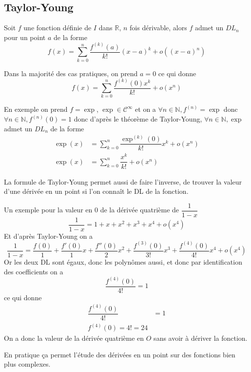 \documentclass[11pt,colorlinks]{book}
\theoremstyle{mytheoremstyle}
\theoremstyle{mytheoremstyle}
\theoremstyle{mytheoremstyle}
\theoremstyle{mytheoremstyle}
\theoremstyle{mytheoremstyle}
\theoremstyle{mytheoremstyle}
\theoremstyle{mytheoremstyle}
\theoremstyle{mytheoremstyle}
\theoremstyle{myproblemstyle}
\def\mbb#1{\mathbb{#1}}
\def\bN{\mbb{N}}
\def\bR{\mbb{R}}
\begin{document}
  \subsection{Taylor-Young}
  \begin{theorem}
    Soit $f$ une fonction définie de $I$ dans $\bR$, $n$ fois dérivable, alors $f$ admet un $DL_n$ pour un point $a$ de la forme 
    \begin{equation*}
      f(x) = \sum_{k=0}^n \dfrac{f^{(k)}(a)}{k!} (x-a)^k + o((x-a)^n)
    \end{equation*} 
  \end{theorem}
  \begin{rmq}
    Dans la majorité des cas pratiques, on prend $a=0$ ce qui donne
    \begin{equation*}
      f(x) = \sum_{k=0}^n \dfrac{f^{(k)}(0)x^k}{k!} + o(x^n)
    \end{equation*}
  \end{rmq}
  \begin{ex}
    En exemple on prend $f = \exp$, $\exp \in \mathcal{C}^{\infty}$ et on a $\forall n \in \bN, f^{(n)} = \exp$ donc $\forall n \in \bN, f^{(n)}(0) = 1$
    donc d'après le théorème de Taylor-Young, $\forall n \in \bN, \exp$ admet un $DL_n$ de la forme 
    \begin{align*}
      \exp(x) &= \sum_{k=0}^n \dfrac{\exp^{(k)}(0)}{k!} x^k + o(x^n) \\ 
      \exp(x) &= \sum_{k=0}^n \dfrac{x^k}{k!} + o(x^n)
    \end{align*}
  \end{ex}
  \begin{rmq}
    La formule de Taylor-Young permet aussi de faire l'inverse, de trouver la valeur d'une dérivée en un point si l'on connaît le DL de la fonction. 
    \begin{ex}
      Un exemple pour la valeur en $0$ de la dérivée quatrième de $\dfrac{1}{1-x}$ 
      \begin{equation*}
        \dfrac{1}{1-x} = 1 + x + x^2 + x^3 + x^4 + o(x^4)
      \end{equation*}
      Et d'après Taylor-Young on a 
      \begin{equation*}
        \dfrac{1}{1-x} = \dfrac{f(0)}{1} + \dfrac{f'(0)}{1}x + \dfrac{f''(0)}{2}x^2 + \dfrac{f^{(3)}(0)}{3!}x^3 + \dfrac{f^{(4)}(0)}{4!}x^4 + o(x^4)
      \end{equation*}
      Or les deux DL sont égaux, donc les polynômes aussi, et donc par identification des coefficients on a
      \begin{equation*}
        \dfrac{f^{(4)}(0)}{4!} = 1
      \end{equation*}
      ce qui donne 
      \begin{align*}
        \dfrac{f^{(4)}(0)}{4!} &= 1 \\ 
        f^{(4)}(0) = 4! = 24
      \end{align*}
      On a donc la valeur de la dérivée quatrième en $O$ sans avoir à dériver la fonction.
    \end{ex}
    En pratique ça permet l'étude des dérivées en un point sur des fonctions bien plus complexes.
  \end{rmq}
\end{document}
